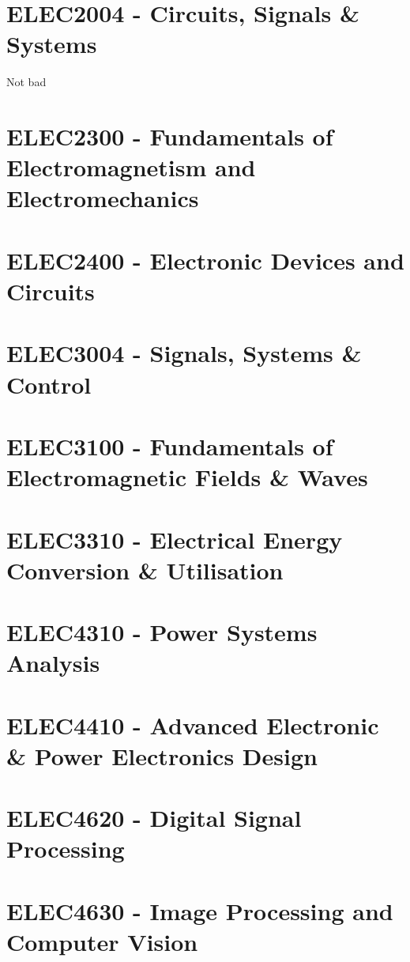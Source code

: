 \documentclass[a4paper,12pt]{report}
\begin{document}
\hypertarget{ELEC2004}{\section{ELEC2004 - Circuits, Signals \& Systems}}
Not bad

\hypertarget{ELEC2300}{\section{ELEC2300 - Fundamentals of Electromagnetism and Electromechanics}}

\hypertarget{ELEC2400}{\section{ELEC2400 - Electronic Devices and Circuits}}

\hypertarget{ELEC3004}{\section{ELEC3004 - Signals, Systems \& Control}}

\hypertarget{ELEC3100}{\section{ELEC3100 - Fundamentals of Electromagnetic Fields \& Waves}}

\hypertarget{ELEC3310}{\section{ELEC3310 - Electrical Energy Conversion \& Utilisation}}

\hypertarget{ELEC4310}{\section{ELEC4310 - Power Systems Analysis}}

\hypertarget{ELEC4410}{\section{ELEC4410 - Advanced Electronic \& Power Electronics Design}}

\hypertarget{ELEC4620}{\section{ELEC4620 - Digital Signal Processing}}

\hypertarget{ELEC4630}{\section{ELEC4630 - Image Processing and Computer Vision}}
\end{document}
